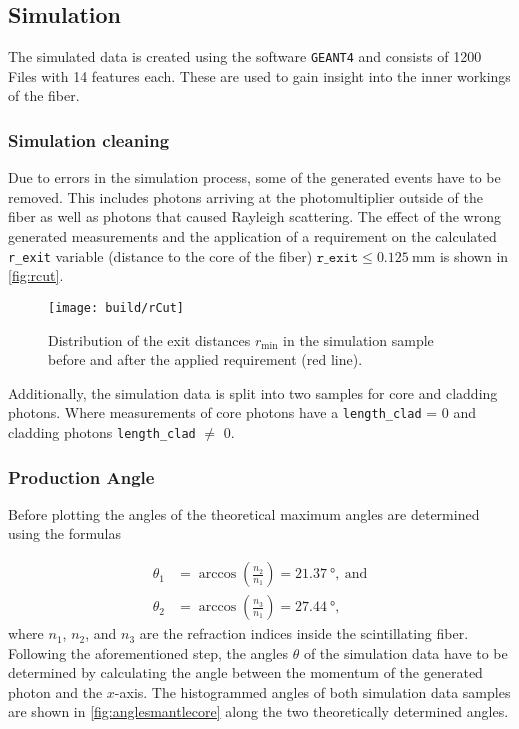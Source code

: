 \subsection{Simulation}

The simulated data is created using the software \texttt{GEANT4} and consists of 1200 Files with 14 features each. 
These are used to gain insight into the inner workings of the fiber. 
\subsubsection{Simulation cleaning}
Due to errors in the simulation process, some of the generated events have to be removed. 
This includes photons arriving at the photomultiplier outside of the fiber as well as photons that caused Rayleigh scattering. 
The effect of the wrong generated measurements and the application of a requirement on the calculated \texttt{r\_exit} variable 
(distance to the core of the fiber) $\mathtt{r\_exit}\leq \qty{0.125}{\milli\meter}$ is shown in \autoref{fig:rcut}.

\begin{figure}
	\centering
	\texttt{[image: build/rCut]}
	\caption{Distribution of the exit distances $r_\mathrm{min}$ in the simulation sample before and after the applied requirement (red line).}
	\label{fig:rcut}
\end{figure}

Additionally, the simulation data is split into two samples for core and cladding photons. Where measurements of core photons have a \texttt{length\_clad} = 0 and cladding photons \texttt{length\_clad} $\neq$ 0.

\subsubsection{Production Angle}
Before plotting the angles of the theoretical maximum angles are determined using the formulas

\begin{align*}
	\theta_1 &= \arccos\left(\frac{n_2}{n_1}\right) = \qty{21.37}{\degree},\ \mathrm{and}\\
	\theta_2 &= \arccos\left(\frac{n_3}{n_1}\right) = \qty{27.44}{\degree},
\end{align*}
where $n_1$, $n_2$, and $n_3$ are the refraction indices inside the scintillating fiber.
Following the aforementioned step, the angles $\theta$ of the simulation data have to be determined by 
calculating the angle between the momentum of the generated photon and the $x$-axis. 
The histogrammed angles of both simulation data samples are shown in \autoref{fig:anglesmantlecore} along the two theoretically determined angles.


